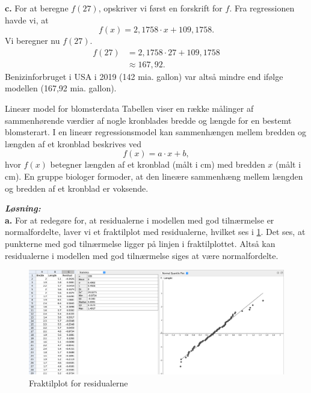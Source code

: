 \documentclass{article}
\newcommand{\sol}{\setlength{\parindent}{0cm}\textbf{\textit{Løsning:}}\setlength{\parindent}{1cm}}
\begin{document}
\noindent \textbf{c.}
For at beregne $f(27)$, opskriver vi først en forskrift for $f$.
Fra regressionen havde vi, at 
\[
f(x)= 2,1758 \cdot x + 109,1758.
\] 
Vi beregner nu $f(27)$.
\begin{equation*}
\begin{split}
  f(27)&=2,1758 \cdot 27 + 109,1758\\
  &\approx 167,92.
\end{split}
\end{equation*}
Benizinforbruget i USA i 2019 (142 mia. gallon) var altså mindre end ifølge modellen (167,92 mia. gallon).

\begin{question}{Lineær model for blomsterdata}{}
 Tabellen viser en række målinger af sammenhørende værdier af nogle kronblades bredde og længde for en bestemt blomsterart.
 I en lineær regressionsmodel kan sammenhængen mellem bredden og længden af et kronblad beskrives ved
  \[
  f(x)= a \cdot x + b,
  \] 
  hvor $f(x)$ betegner længden af et kronblad (målt i cm) med bredden $x$ (målt i cm).
  En gruppe biologer formoder, at den lineære sammenhæng mellem længden og bredden af et kronblad er voksende.
\end{question}
\sol \\
\textbf{a.}
For at redegøre for, at residualerne i modellen med god tilnærmelse er normalfordelte, laver vi et fraktilplot med residualerne, hvilket ses i \cref{fig:resifraktil}.
Det ses, at punkterne med god tilnærmelse ligger på linjen i fraktilplottet.
Altså kan residualerne i modellen med god tilnærmelse siges at være normalfordelte.

\begin{figure}[H]
\begin{center}
  \includegraphics[width=\textwidth]{resifraktil.png}
\end{center}
\caption{Fraktilplot for residualerne}
\label{fig:resifraktil}
\end{figure}
\end{document}
